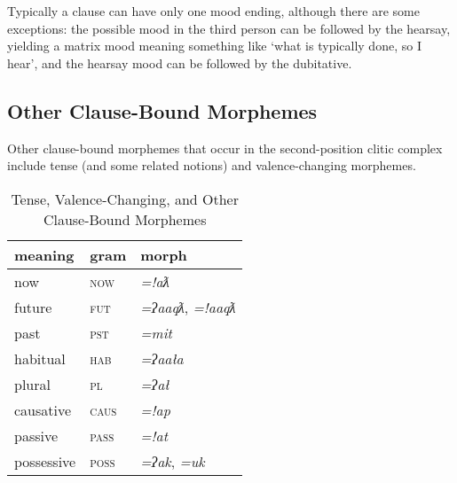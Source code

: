 Typically a clause can have only one mood ending, although there are some exceptions: the possible mood in the third person can be followed by the hearsay, yielding a matrix mood meaning something like `what is typically done, so I hear', and the hearsay mood can be followed by the dubitative.

\subsection{Other Clause-Bound Morphemes} \label{sec:otherclause}

Other clause-bound morphemes that occur in the second-position clitic complex include tense (and some related notions) and valence-changing morphemes.

\begin{table}[ht]
\centering
\caption{Tense, Valence-Changing, and Other Clause-Bound Morphemes}
\label{table:tense}
\begin{tabular}{lll}
meaning                        & gram               & morph                        \\ \hline
\multicolumn{1}{|l|}{now}      & \multicolumn{1}{l|}{\textsc{now}}   & \multicolumn{1}{l|}{\textit{=!aƛ}}     \\ \hline
\multicolumn{1}{|l|}{future}   & \multicolumn{1}{l|}{\textsc{fut}}   & \multicolumn{1}{l|}{\textit{=ʔaaqƛ}, \textit{=!aaqƛ}}   \\ \hline
\multicolumn{1}{|l|}{past}     & \multicolumn{1}{l|}{\textsc{pst}}   & \multicolumn{1}{l|}{\textit{=mit}}     \\ \hline
\multicolumn{1}{|l|}{habitual} & \multicolumn{1}{l|}{\textsc{hab}} & \multicolumn{1}{l|}{\textit{=ʔaała}}    \\ \hline
\multicolumn{1}{|l|}{plural\footnotemark} & \multicolumn{1}{l|}{\textsc{pl}} & \multicolumn{1}{l|}{\textit{=ʔał}}    \\ \hline
\multicolumn{1}{|l|}{causative}  & \multicolumn{1}{l|}{\textsc{caus}} & \multicolumn{1}{l|}{\textit{=!ap}}      \\ \hline
\multicolumn{1}{|l|}{passive\footnotemark}    & \multicolumn{1}{l|}{\textsc{pass}} & \multicolumn{1}{l|}{\textit{=!at}}      \\ \hline
\multicolumn{1}{|l|}{possessive} & \multicolumn{1}{l|}{\textsc{poss}} & \multicolumn{1}{l|}{\textit{=ʔak}, \textit{=uk}} \\ \hline
\end{tabular}
\end{table}

